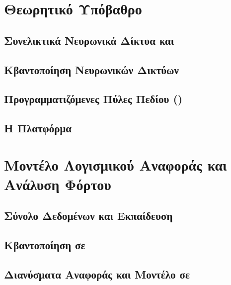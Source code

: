 \section{Θεωρητικό Υπόβαθρο}

\subsection{Συνελικτικά Νευρωνικά Δίκτυα και }

\subsection{Κβαντοποίηση Νευρωνικών Δικτύων}

\subsection{Προγραμματιζόμενες Πύλες Πεδίου ()}

\subsection{Η Πλατφόρμα }

\section{Μοντέλο Λογισμικού Αναφοράς και Ανάλυση Φόρτου}

\subsection{Σύνολο Δεδομένων και Εκπαίδευση}

\subsection{Κβαντοποίηση σε }

\subsection{Διανύσματα Αναφοράς και Μοντέλο σε }

